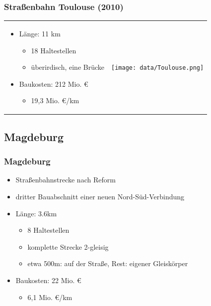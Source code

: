 \documentclass[xcolor=dvipsnames]{beamer}
\begin{document}

\begin{frame}
  \frametitle{Straßenbahn Toulouse (2010)}

  \begin{tabular}{lc}
    \begin{minipage}{.5\linewidth}
      \begin{itemize}
      \item Länge: 11 km
        \begin{itemize}
        \item 18 Haltestellen
        \item überirdisch, eine Brücke
        \end{itemize}
      \item Baukosten: 212 Mio. €
        \begin{itemize}
        \item 19,3 Mio. €/km
        \end{itemize}
      \end{itemize}
    \end{minipage}
    &
    \begin{minipage}{.5\linewidth}
      \texttt{[image: data/Toulouse.png]}
    \end{minipage}
  \end{tabular}
\end{frame}


\subsection{Magdeburg}
\begin{frame}
  \frametitle{Magdeburg}

  \begin{itemize}
  \item Straßenbahnstrecke nach Reform
  \item dritter Bauabschnitt einer neuen Nord-Süd-Verbindung
  \item Länge: 3.6km
    \begin{itemize}
    \item 8 Haltestellen
    \item komplette Strecke 2-gleisig
    \item etwa 500m: auf der Straße, Rest: eigener Gleiskörper
    \end{itemize}
  \item Baukosten: 22 Mio. €
    \begin{itemize}
    \item 6,1 Mio. €/km
    \end{itemize}
  \end{itemize}
\end{frame}
\end{document}
